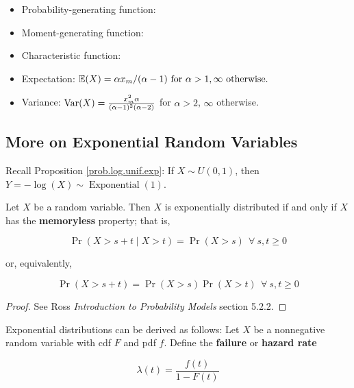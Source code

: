 \begin{itemize}
\begin{itemize}
\item Probability-generating function:

\item Moment-generating function:

\item Characteristic function:

\item Expectation: \(\mathbb{E}(X) = \alpha x_m/(\alpha -1) \text{ for } \alpha > 1, \infty \text{ otherwise.}\)

\item Variance: \(\mathrm{Var}(X) = \frac{x_m^2\alpha}{(\alpha-1)^2(\alpha - 2)}\) for \(\alpha > 2\), \(\infty\) otherwise.

\end{itemize}

\subsection{More on Exponential Random Variables}\label{prob.exp.rand.vars}

\begin{remark}
Recall Proposition \ref{prob.log.unif.exp}: If \(X \sim U(0, 1)\), then \(Y = - \log(X) \sim \operatorname{Exponential}(1)\). 
\end{remark}

\begin{proposition}\label{prob.exp.memoryless} Let \(X\) be a random variable. Then \(X\) is exponentially distributed if and only if \(X\) has the \textbf{memoryless} property; that is,

\[
\Pr(X > s + t \mid X > t) = \Pr(X > s) \ \ \forall \ s, t \geq 0
\]

or, equivalently,

\[
\Pr(X > s + t ) = \Pr(X > s)\Pr(X > t) \ \ \forall \ s, t \geq 0
\]

\end{proposition}

\begin{proof} See Ross \textit{Introduction to Probability Models} section 5.2.2.

\end{proof}

\begin{remark} Exponential distributions can be derived as follows: Let \(X\) be a nonnegative random variable with cdf \(F\) and pdf \(f\). Define the \textbf{failure} or \textbf{hazard rate}

\[
\lambda(t) = \frac{f(t)}{1 - F(t)}
\]


\end{remark}
\end{itemize}
